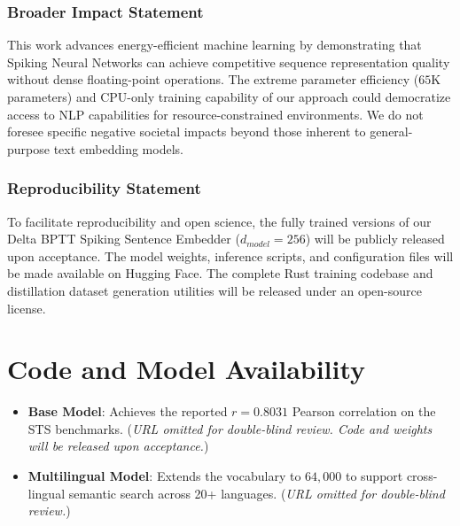 \documentclass[10pt]{article} %
\begin{document}
\subsubsection*{Broader Impact Statement}
This work advances energy-efficient machine learning by demonstrating that Spiking Neural Networks can achieve competitive sequence representation quality without dense floating-point operations. The extreme parameter efficiency ($65$K parameters) and CPU-only training capability of our approach could democratize access to NLP capabilities for resource-constrained environments. We do not foresee specific negative societal impacts beyond those inherent to general-purpose text embedding models.

\subsubsection*{Reproducibility Statement}
To facilitate reproducibility and open science, the fully trained versions of our Delta BPTT Spiking Sentence Embedder ($d_{model} = 256$) will be publicly released upon acceptance. The model weights, inference scripts, and configuration files will be made available on Hugging Face. The complete Rust training codebase and distillation dataset generation utilities will be released under an open-source license.




\appendix
\section{Code and Model Availability}
\begin{itemize}
    \item \textbf{Base Model}: Achieves the reported $r = 0.8031$ Pearson correlation on the STS benchmarks. (\textit{URL omitted for double-blind review. Code and weights will be released upon acceptance.})
    \item \textbf{Multilingual Model}: Extends the vocabulary to $64{,}000$ to support cross-lingual semantic search across 20+ languages. (\textit{URL omitted for double-blind review.})
\end{itemize}
\end{document}

